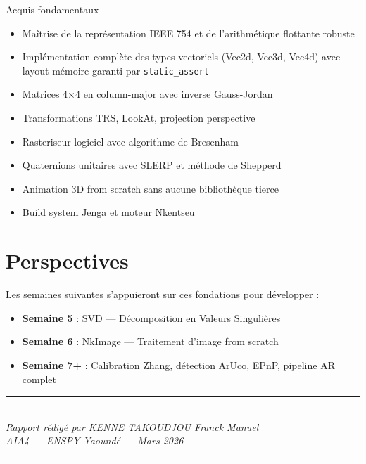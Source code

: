 \documentclass[12pt,a4paper]{report}
\begin{document}
\begin{successbox}{Acquis fondamentaux}
\begin{itemize}
    \item Maîtrise de la représentation IEEE 754 et de l'arithmétique
          flottante robuste
    \item Implémentation complète des types vectoriels (Vec2d, Vec3d, Vec4d)
          avec layout mémoire garanti par \texttt{static\_assert}
    \item Matrices 4$\times$4 en column-major avec inverse Gauss-Jordan
    \item Transformations TRS, LookAt, projection perspective
    \item Rasteriseur logiciel avec algorithme de Bresenham
    \item Quaternions unitaires avec SLERP et méthode de Shepperd
    \item Animation 3D from scratch sans aucune bibliothèque tierce
    \item Build system Jenga et moteur Nkentseu
\end{itemize}
\end{successbox}

\section*{Perspectives}

Les semaines suivantes s'appuieront sur ces fondations pour développer :

\begin{itemize}
    \item \textbf{Semaine 5} : SVD --- Décomposition en Valeurs Singulières
    \item \textbf{Semaine 6} : NkImage --- Traitement d'image from scratch
    \item \textbf{Semaine 7+} : Calibration Zhang, détection ArUco, EPnP,
          pipeline AR complet
\end{itemize}

\vfill

\begin{center}
    \textcolor{titlecolor}{\rule{0.5\linewidth}{1pt}}\\[0.5em]
    \textit{Rapport rédigé par KENNE TAKOUDJOU Franck Manuel}\\
    \textit{AIA4 --- ENSPY Yaoundé --- Mars 2026}\\
    \textcolor{titlecolor}{\rule{0.5\linewidth}{1pt}}
\end{center}
\end{document}
